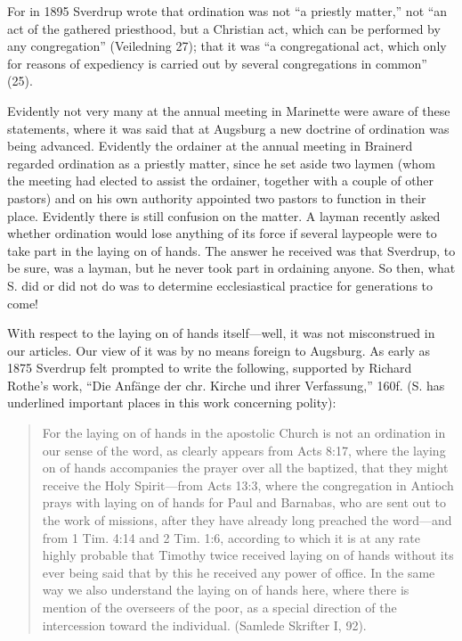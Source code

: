 For in 1895 Sverdrup wrote that ordination was not “a priestly matter,” not “an act of the gathered priesthood, but a Christian act, which can be performed by any congregation” (Veiledning 27); that it was “a congregational act, which only for reasons of expediency is carried out by several congregations in common” (25).

Evidently not very many at the annual meeting in Marinette were aware of these statements, where it was said that at Augsburg a new doctrine of ordination was being advanced. Evidently the ordainer at the annual meeting in Brainerd regarded ordination as a priestly matter, since he set aside two laymen (whom the meeting had elected to assist the ordainer, together with a couple of other pastors) and on his own authority appointed two pastors to function in their place. Evidently there is still confusion on the matter. A layman recently asked whether ordination would lose anything of its force if several laypeople were to take part in the laying on of hands. The answer he received was that Sverdrup, to be sure, was a layman, but he never took part in ordaining anyone. So then, what S. did or did not do was to determine ecclesiastical practice for generations to come!

With respect to the laying on of hands itself—well, it was not misconstrued in our articles. Our view of it was by no means foreign to Augsburg. As early as 1875 Sverdrup felt prompted to write the following, supported by Richard Rothe’s work, “Die Anfänge der chr. Kirche und ihrer Verfassung,” 160f. (S. has underlined important places in this work concerning polity):

\begin{quote}For the laying on of hands in the apostolic Church is not an ordination in our sense of the word, as clearly appears from Acts 8:17, where the laying on of hands accompanies the prayer over all the baptized, that they might receive the Holy Spirit—from Acts 13:3, where the congregation in Antioch prays with laying on of hands for Paul and Barnabas, who are sent out to the work of missions, after they have already long preached the word—and from 1 Tim. 4:14 and 2 Tim. 1:6, according to which it is at any rate highly probable that Timothy twice received laying on of hands without its ever being said that by this he received any power of office. In the same way we also understand the laying on of hands here, where there is mention of the overseers of the poor, as a special direction of the intercession toward the individual. (Samlede Skrifter I, 92).
\end{quote}

